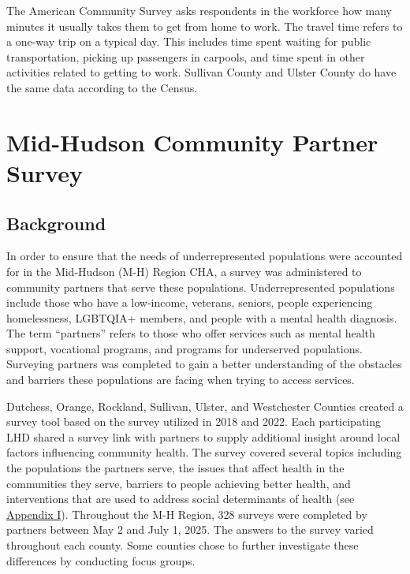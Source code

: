 \documentclass[
  english,
  letterpaper,
]{report}
\begin{document}
\begin{tcolorbox}[enhanced jigsaw, breakable, leftrule=.75mm, title=\textcolor{quarto-callout-note-color}{\faInfo}\hspace{0.5em}{Note}, bottomrule=.15mm, opacityback=0, left=2mm, colback=white, bottomtitle=1mm, coltitle=black, colbacktitle=quarto-callout-note-color!10!white, colframe=quarto-callout-note-color-frame, opacitybacktitle=0.6, toptitle=1mm, titlerule=0mm, arc=.35mm, rightrule=.15mm, toprule=.15mm]

The American Community Survey asks respondents in the workforce how many
minutes it usually takes them to get from home to work. The travel time
refers to a one-way trip on a typical day. This includes time spent
waiting for public transportation, picking up passengers in carpools,
and time spent in other activities related to getting to work. Sullivan
County and Ulster County do have the same data according to the Census.

\end{tcolorbox}


\chapter{Mid-Hudson Community Partner
Survey}\label{mid-hudson-community-partner-survey}

\section{Background}\label{background}

In order to ensure that the needs of underrepresented populations were
accounted for in the Mid-Hudson (M-H) Region CHA, a survey was
administered to community partners that serve these populations.
Underrepresented populations include those who have a low-income,
veterans, seniors, people experiencing homelessness, LGBTQIA+ members,
and people with a mental health diagnosis. The term ``partners'' refers
to those who offer services such as mental health support, vocational
programs, and programs for underserved populations. Surveying partners
was completed to gain a better understanding of the obstacles and
barriers these populations are facing when trying to access services.

Dutchess, Orange, Rockland, Sullivan, Ulster, and Westchester Counties
created a survey tool based on the survey utilized in 2018 and 2022.
Each participating LHD shared a survey link with partners to supply
additional insight around local factors influencing community health.
The survey covered several topics including the populations the partners
serve, the issues that affect health in the communities they serve,
barriers to people achieving better health, and interventions that are
used to address social determinants of health (see
\hyperref[sec-appendix-i-community-partner-survey]{Appendix I}).
Throughout the M-H Region, 328 surveys were completed by partners
between May 2 and July 1, 2025. The answers to the survey varied
throughout each county. Some counties chose to further investigate these
differences by conducting focus groups.
\end{document}
